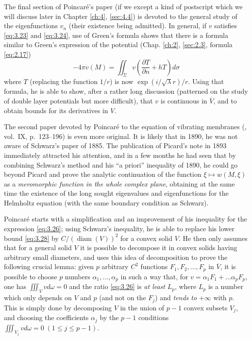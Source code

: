 \documentclass[12pt,a4paper,leqno,twoside]{extbook}
\newcommand{\diam}{\operatorname{diam}}
\newcommand{\pder}[2]{\frac{\partial #1}{\partial #2}}
\begin{document}
The final section of Poincaré's paper (if we except a kind of postscript which we will discuss later in Chapter \ref{ch:4}, \ref{sec:4.4}) is devoted to the general study of the eigenfunctions \(v_n\) (their existence being admitted). In general, if \(v\) satisfies \eqref{eq:3.23} and \eqref{eq:3.24}, use of Green's formula shows that there is a formula similar to Green's expression of the potential (Chap. \ref{ch:2}, \ref{sec:2.3}, formula \eqref{eq:2.17})
\begin{equation}
    \label{eq:3.30}
    -4\pi v(M) = \iint_\Sigma v\left( \pder{T}{n} + hT \right)d\sigma
\end{equation}
where \(T\) (replacing the function \(1/r\)) is now \(\exp(i/\sqrt{\lambda} r)/r\). Using that formula, he is able to show, after a rather long discussion (patterned on the study of double layer potentials but more difficult), that \(v\) is continuous in \(\overline{V}\), and to obtain bounds for its derivatives in \(V\).

The second paper devoted by Poincaré to the equation of vibrating membranes (\cite{177}, vol.~IX, p.~123--196) is even more original. It is likely that in 1890, he was not aware of Schwarz's paper of 1885. The publication of Picard's note in 1893 immediately attracted his attention, and in a few months he had seen that by combining Schwarz's method and his ``a priori'' inequality of 1890, he could go beyond Picard and prove the analytic continuation of the function \(\xi \mapsto w(M, \xi)\) as a \emph{meromorphic function in the whole complex plane}, obtaining at the same time the existence of the long sought eigenvalues and eigenfunctions for the Helmholtz equation (with the same boundary condition as Schwarz).

Poincaré starts with a simplification and an improvement of his inequality for the expression \eqref{eq:3.26}; using Schwarz's inequality, he is able to replace his lower bound \eqref{eq:3.28} by \(C/(\diam(V))^2\) for a convex solid \(V\). He then only assumes that for a general solid \(V\) it is possible to decompose it in convex solids having arbitrary small diameters, and uses this idea of decomposition to prove the following crucial lemma: given \(p\) arbitrary \(C^2\) functions \(F_1, F_2, \ldots, F_p\) in \(\overline{V}\), it is possible to choose \(p\) numbers \(\alpha_1, \ldots, \alpha_p\) in such a way that, for \(v = \alpha_1 F_1 + \ldots \alpha_p F_p\), one has \(\iiint_V v d\omega = 0\) and the ratio \eqref{eq:3.26} is \emph{at least} \(L_p\), where \(L_p\) is a number which only depends on \(V\) and \(p\) (and not on the \(F_j\)) and \emph{tends to} \(+\infty\) with \(p\). This is simply done by decomposing \(V\) in the union of \(p-1\) convex subsets \(V_j\), and choosing the coefficients \(\alpha_j\) by the \(p-1\) conditions \(\iiint_{V_j} v d\omega = 0 \; (1 \leq j \leq p - 1)\).
\end{document}
